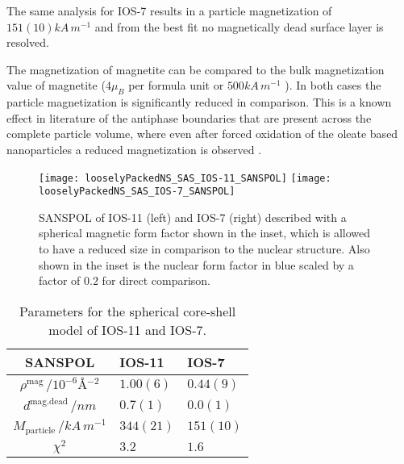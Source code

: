 \documentclass[\main/dresen_thesis.tex]{subfiles}
\begin{document}
    The same analysis for IOS-7 results in a particle magnetization of $151(10) \unit{kA \, m^{-1}}$ and from the best fit no magnetically dead surface layer is resolved.

    The magnetization of magnetite can be compared to the bulk magnetization value of magnetite ($4 \mu_B$ per formula unit or $500 \unit{kA \, m^{-1}}$ \cite{Handley_2000_Moder}).
    In both cases the particle magnetization is significantly reduced in comparison.
    This is a known effect in literature of the antiphase boundaries that are present across the complete particle volume, where even after forced oxidation of the oleate based nanoparticles a reduced magnetization is observed \cite{Wetterskog_2013_Anoma}.

    \begin{figure}[!htbp]
      \centering
      \texttt{[image: looselyPackedNS\_SAS\_IOS-11\_SANSPOL]}
      \texttt{[image: looselyPackedNS\_SAS\_IOS-7\_SANSPOL]}
      \caption{\label{fig:looselyPackedNP:nanoparticle:sanspol}SANSPOL of IOS-11 (left) and IOS-7 (right) described with a spherical magnetic form factor shown in the inset, which is allowed to have a reduced size in comparison to the nuclear structure. Also shown in the inset is the nuclear form factor in blue scaled by a factor of $0.2$ for direct comparison.}
    \end{figure}

    \begin{table}[!htbp]
      \centering
      \caption{\label{tab:looselyPackedNP:nanoparticle:sanspol}Parameters for the spherical core-shell model of IOS-11 and IOS-7.}
      \begin{tabular}{ c | l | l }
        \rule{0pt}{2ex} \textbf{SANSPOL}  & \textbf{IOS-11} & \textbf{IOS-7} \\
        \hline
        \rule{0pt}{2ex} $\rho^\mathrm{mag} \, / \unit{10^{-6} \angstrom^{-2}}$ & $1.00(6)$ & $0.44(9)$\\
        \rule{0pt}{2ex} $d^\mathrm{mag. dead} \, / \unit{nm}$                  & $0.7(1)$  & $0.0(1)$\\
        \hline
        \rule{0pt}{2ex} $M_\mathrm{particle} \, / \unit{kA \, m^{-1}}$            & $344(21)$ & $151(10)$\\
        \hline
        \rule{0pt}{2ex} $\chi^2$                                               & $3.2$     & $1.6$\\
        \hline
      \end{tabular}
    \end{table}
\end{document}
